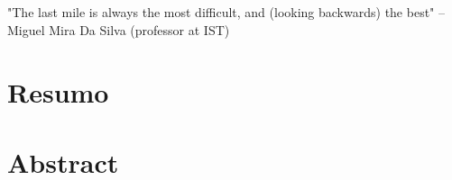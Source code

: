 \chapter*{}
\thispagestyle{empty}

\vfill
\mbox{}
\vfill\Large
\begin{flushright}
  \begin{minipage}{8cm}
    \begin{center}

"The last mile is always the most difficult, and (looking backwards) the best" -- Miguel Mira Da Silva (professor at IST)

    \end{center}
  \end{minipage}
\end{flushright}
\normalsize\vfill

\cleardoublepage


\chapter*{Resumo}
\thispagestyle{empty}

\newpage


\chapter*{Abstract}
\thispagestyle{empty}

